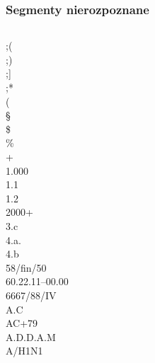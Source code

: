 \documentclass[xcolor=dvipsnames,polish]{beamer}
\begin{document}
\begin{frame}[allowframebreaks]
   \frametitle{Segmenty nierozpoznane}
 \scriptsize
   \begin{columns}
 \begin{column}{.15\textwidth}
 ;(\\
 ;)\\
 ;]\\
 ;*\\
 (\\
 §\\
 \$\\
 \%\\
 +\\
 1.000\\
 1.1\\
 1.2\\
 2000+\\
 3.c\\
 4.a.\\
 4.b\\
 58/fin/50\\
 60.22.11–00.00\\
 6667/88/IV\\
 A.C\\
 AC+79\\
A.D.D.A.M\\
 A/H1N1\\
 \end{column}



\end{columns}
\end{frame}
\end{document}
